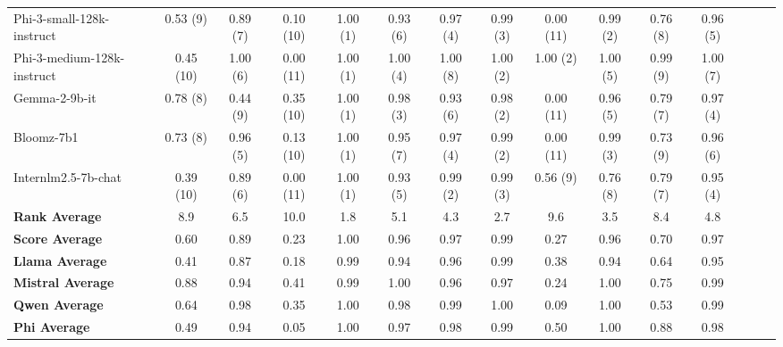 \begin{table*}[h!]
{\begin{tabular}{l | c c c c c c c c c c c c c c}
    Phi-3-small-128k-instruct & 0.53 (9) & 0.89 (7) & 0.10 (10) & 1.00 (1) & 0.93 (6) & 0.97 (4) & 0.99 (3) & 0.00 (11) & 0.99 (2) & 0.76 (8) & 0.96 (5) \\
    Phi-3-medium-128k-instruct & 0.45 (10) & 1.00 (6) & 0.00 (11) & 1.00 (1) & 1.00 (4) & 1.00 (8) & 1.00 (2) & 1.00 (2) & 1.00 (5) & 0.99 (9) & 1.00 (7) \\
    Gemma-2-9b-it & 0.78 (8) & 0.44 (9) & 0.35 (10) & 1.00 (1) & 0.98 (3) & 0.93 (6) & 0.98 (2) & 0.00 (11) & 0.96 (5) & 0.79 (7) & 0.97 (4) \\
    Bloomz-7b1 & 0.73 (8) & 0.96 (5) & 0.13 (10) & 1.00 (1) & 0.95 (7) & 0.97 (4) & 0.99 (2) & 0.00 (11) & 0.99 (3) & 0.73 (9) & 0.96 (6) \\
    Internlm2.5-7b-chat & 0.39 (10) & 0.89 (6) & 0.00 (11) & 1.00 (1) & 0.93 (5) & 0.99 (2) & 0.99 (3) & 0.56 (9) & 0.76 (8) & 0.79 (7) & 0.95 (4) \\
\midrule
\midrule
    \rowcolor{white}\textbf{Rank Average} & 8.9 & 6.5 & \cellcolor{blue!10}10.0 & \cellcolor{red!10}1.8 & 5.1 & 4.3 & \cellcolor{red!10}2.7 & \cellcolor{blue!10}9.6 & 3.5 & 8.4 & 4.8 \\
    \rowcolor{white}\textbf{Score Average} & 0.60 & 0.89 & \cellcolor{blue!10}0.23 & \cellcolor{red!10}1.00 & \cellcolor{red!10}0.96 & \cellcolor{red!10}0.97 & \cellcolor{red!10}0.99 & \cellcolor{blue!10}0.27 & \cellcolor{red!10}0.96 & 0.70 & \cellcolor{red!10}0.97 \\
\midrule
    \rowcolor{white}\textbf{Llama Average} & 0.41 & 0.87 & \cellcolor{blue!10}0.18 & \cellcolor{red!10}0.99 & \cellcolor{red!10}0.94 & \cellcolor{red!10}0.96 & \cellcolor{red!10}0.99 & 0.38 & \cellcolor{red!10}0.94 & 0.64 & \cellcolor{red!10}0.95 \\
    \rowcolor{white}\textbf{Mistral Average} & 0.88 & 0.94 & 0.41 & \cellcolor{red!10}0.99 & \cellcolor{red!10}1.00 & \cellcolor{red!10}0.96 & \cellcolor{red!10}0.97 & \cellcolor{blue!10}0.24 & \cellcolor{red!10}1.00 & 0.75 & \cellcolor{red!10}0.99 \\
    \rowcolor{white}\textbf{Qwen Average} & 0.64 & \cellcolor{red!10}0.98 & 0.35 & \cellcolor{red!10}1.00 & \cellcolor{red!10}0.98 & \cellcolor{red!10}0.99 & \cellcolor{red!10}1.00 & \cellcolor{blue!10}0.09 & \cellcolor{red!10}1.00 & 0.53 & \cellcolor{red!10}0.99 \\
    \rowcolor{white}\textbf{Phi Average} & 0.49 & 0.94 & \cellcolor{blue!10}0.05 & \cellcolor{red!10}1.00 & \cellcolor{red!10}0.97 & \cellcolor{red!10}0.98 & \cellcolor{red!10}0.99 & 0.50 & \cellcolor{red!10}1.00 & 0.88 & \cellcolor{red!10}0.98 \\

\end{tabular}}
\end{table*}
